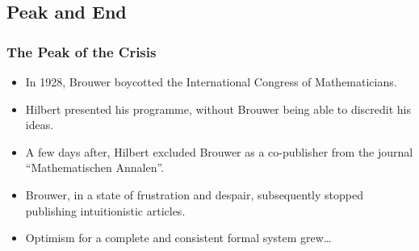 \documentclass{beamer}
\begin{document}
\subsection{Peak and End}
\begin{frame}
    \frametitle{The Peak of the Crisis}
    \begin{itemize}[<+->]
	\item In 1928, Brouwer boycotted the International Congress of Mathematicians.
	\item Hilbert presented his programme, without Brouwer being able to discredit his ideas.
	\item A few days after, Hilbert excluded Brouwer as a co-publisher from the journal ``Mathematischen Annalen''.
	\item Brouwer, in a state of frustration and despair, subsequently stopped publishing intuitionistic articles.
	\item Optimism for a complete and consistent formal system grew\ldots
    \end{itemize}
\end{frame}
\end{document}
